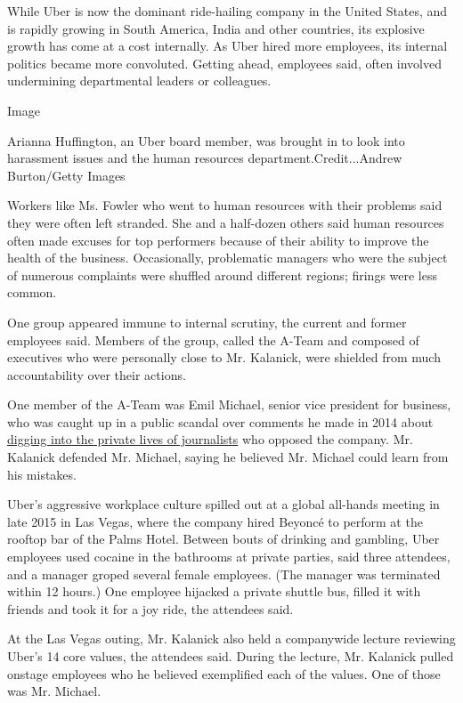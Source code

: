 While Uber is now the dominant ride-hailing company in the United
States, and is rapidly growing in South America, India and other
countries, its explosive growth has come at a cost internally. As Uber
hired more employees, its internal politics became more convoluted.
Getting ahead, employees said, often involved undermining departmental
leaders or colleagues.

Image

Arianna Huffington, an Uber board member, was brought in to look into
harassment issues and the human resources department.Credit...Andrew
Burton/Getty Images

Workers like Ms. Fowler who went to human resources with their problems
said they were often left stranded. She and a half-dozen others said
human resources often made excuses for top performers because of their
ability to improve the health of the business. Occasionally, problematic
managers who were the subject of numerous complaints were shuffled
around different regions; firings were less common.

One group appeared immune to internal scrutiny, the current and former
employees said. Members of the group, called the A-Team and composed of
executives who were personally close to Mr. Kalanick, were shielded from
much accountability over their actions.

One member of the A-Team was Emil Michael, senior vice president for
business, who was caught up in a public scandal over comments he made in
2014 about
\href{https://bits.blogs.nytimes3xbfgragh.onion/2014/11/18/emil-michael-of-uber-proposes-digging-into-journalists-private-lives/?_r=0}{digging
into the private lives of journalists} who opposed the company. Mr.
Kalanick defended Mr. Michael, saying he believed Mr. Michael could
learn from his mistakes.

Uber's aggressive workplace culture spilled out at a global all-hands
meeting in late 2015 in Las Vegas, where the company hired Beyoncé to
perform at the rooftop bar of the Palms Hotel. Between bouts of drinking
and gambling, Uber employees used cocaine in the bathrooms at private
parties, said three attendees, and a manager groped several female
employees. (The manager was terminated within 12 hours.) One employee
hijacked a private shuttle bus, filled it with friends and took it for a
joy ride, the attendees said.

At the Las Vegas outing, Mr. Kalanick also held a companywide lecture
reviewing Uber's 14 core values, the attendees said. During the lecture,
Mr. Kalanick pulled onstage employees who he believed exemplified each
of the values. One of those was Mr. Michael.

